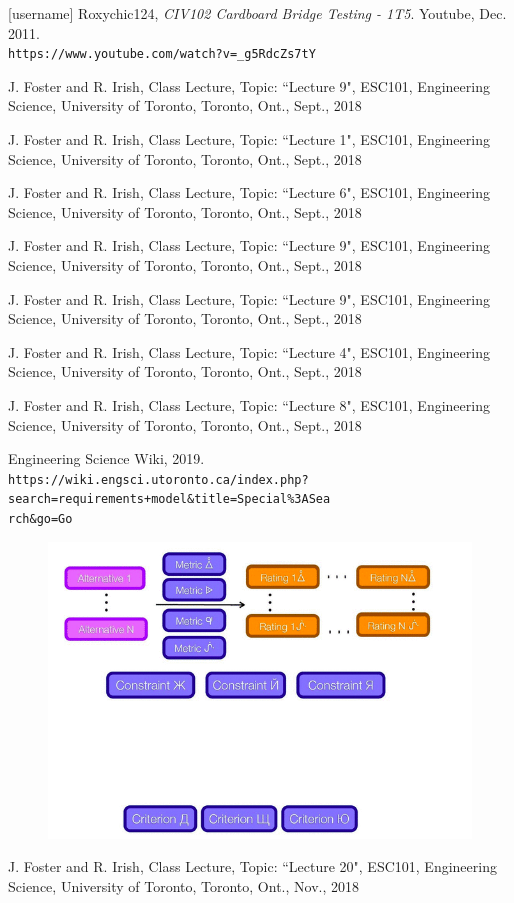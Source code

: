 \documentclass[paper=a4, fontsize=11pt]{article} %
\begin{document}
\begin{thebibliography}{50}
[username] Roxychic124, \textit{CIV102 Cardboard Bridge Testing - 1T5}. Youtube, Dec. 2011.
\\\texttt{https://www.youtube.com/watch?v=\_g5RdcZs7tY}

J. Foster and R. Irish, Class Lecture, Topic: ``Lecture 9", ESC101, Engineering Science, University of Toronto, Toronto, Ont., Sept., 2018

J. Foster and R. Irish, Class Lecture, Topic: ``Lecture 1", ESC101, Engineering Science, University of Toronto, Toronto, Ont., Sept., 2018

J. Foster and R. Irish, Class Lecture, Topic: ``Lecture 6", ESC101, Engineering Science, University of Toronto, Toronto, Ont., Sept., 2018

J. Foster and R. Irish, Class Lecture, Topic: ``Lecture 9", ESC101, Engineering Science, University of Toronto, Toronto, Ont., Sept., 2018

J. Foster and R. Irish, Class Lecture, Topic: ``Lecture 9", ESC101, Engineering Science, University of Toronto, Toronto, Ont., Sept., 2018

J. Foster and R. Irish, Class Lecture, Topic: ``Lecture 4", ESC101, Engineering Science, University of Toronto, Toronto, Ont., Sept., 2018

J. Foster and R. Irish, Class Lecture, Topic: ``Lecture 8", ESC101, Engineering Science, University of Toronto, Toronto, Ont., Sept., 2018

Engineering Science Wiki, 2019.
\\\texttt{https://wiki.engsci.utoronto.ca/index.php?search=requirements+model\&title=Special\%3ASea}
\\\texttt{rch\&go=Go}
\begin{figure}[H]
    \centering
    \includegraphics[width=0.6\linewidth]{erm.png}
\end{figure}

J. Foster and R. Irish, Class Lecture, Topic: ``Lecture 20", ESC101, Engineering Science, University of Toronto, Toronto, Ont., Nov., 2018

\end{thebibliography}
\end{document}
